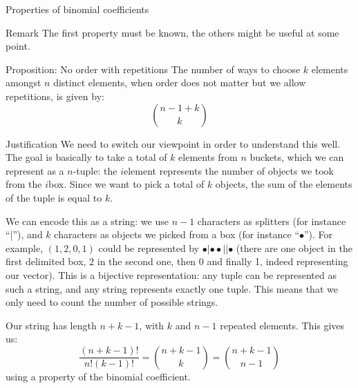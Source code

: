 \documentclass[a4paper]{article}
\begin{document}
\begin{parag}{Properties of binomial coefficients}
    \begin{subparag}{Remark}
        The first property must be known, the others might be useful at some point.
    \end{subparag}
\end{parag}

\begin{parag}{Proposition: No order with repetitions}
    The number of ways to choose $k$ elements amongst $n$ distinct elements, when order does not matter but we allow repetitions, is given by:
    \[\binom{n-1+k}{k}\]

    \begin{subparag}{Justification}
        We need to switch our viewpoint in order to understand this well. The goal is basically to take a total of $k$ elements from $n$ buckets, which we can represent as a $n$-tuple: the $i$\Th element represents the number of objects we took from the $i$\Th box. Since we want to pick a total of $k$ objects, the sum of the elements of the tuple is equal to $k$. 

        We can encode this as a string: we use $n-1$ characters as splitters (for instance ``|''), and $k$ characters as objects we picked from a box (for instance ``$\bullet$''). For example, $\left(1, 2, 0, 1\right)$ could be represented by $\bullet | \bullet \bullet ||\bullet$ (there are one object in the first delimited box, 2 in the second one, then 0 and finally 1, indeed representing our vector). This is a bijective representation: any tuple can be represented as such a string, and any string represents exactly one tuple. This means that we only need to count the number of possible strings.

        Our string has length $n + k - 1$, with $k$ and $n-1$ repeated elements. This gives us: 
        \[\frac{\left(n+k-1\right)!}{n!\left(k-1\right)!} = \binom{n + k - 1}{k} = \binom{n+k-1}{n-1}\]
        using a property of the binomial coefficient.
    \end{subparag}
\end{parag}
\end{document}

